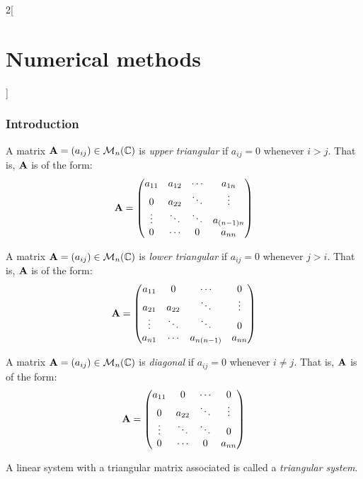 \documentclass[../../../main.tex]{subfiles}
\begin{document}
\begin{multicols}{2}[\section{Numerical methods}]
\subsubsection*{Introduction}
\begin{definition}
    A matrix $\vb{A}=(a_{ij})\in\mathcal{M}_n(\mathbb{C})$ is \textit{upper triangular} if $a_{ij}=0$ whenever $i>j$. That is, $\vb{A}$ is of the form: 
    $$\vb{A}=
    \begin{pmatrix}
        a_{11} & a_{12} & \cdots & a_{1n}\\
        0 & a_{22} & \ddots & \vdots \\
        \vdots & \ddots & \ddots & a_{(n-1)n}\\
        0 & \cdots & 0 & a_{nn}
    \end{pmatrix}
    $$
\end{definition}
\begin{definition}
    A matrix $\vb{A}=(a_{ij})\in\mathcal{M}_n(\mathbb{C})$ is \textit{lower triangular} if $a_{ij}=0$ whenever $j>i$. That is, $\vb{A}$ is of the form: 
    $$\vb{A}=
    \begin{pmatrix}
        a_{11} & 0 & \cdots & 0\\
        a_{21} & a_{22} & \ddots & \vdots \\
        \vdots & \ddots & \ddots & 0\\
        a_{n1} & \cdots & a_{n(n-1)} & a_{nn}
    \end{pmatrix}
    $$
\end{definition}
\begin{definition}
    A matrix $\vb{A}=(a_{ij})\in\mathcal{M}_n(\mathbb{C})$ is \textit{diagonal} if $a_{ij}=0$ whenever $i\ne j$. That is, $\vb{A}$ is of the form: 
    $$\vb{A}=
    \begin{pmatrix}
        a_{11} & 0 & \cdots & 0\\
        0 & a_{22} & \ddots & \vdots \\
        \vdots & \ddots & \ddots & 0\\
        0 & \cdots & 0 & a_{nn}
    \end{pmatrix}
    $$
\end{definition}
\begin{definition}
    A linear system with a triangular matrix associated is called a \textit{triangular system}.
\end{definition}

\end{multicols}
\end{document}
